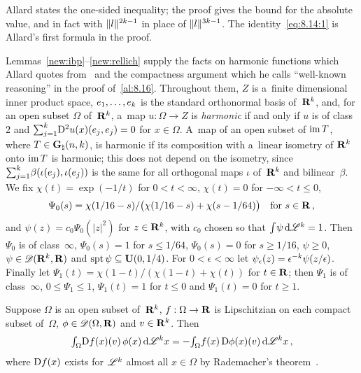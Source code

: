 \begin{remark}
    \label{rem:8.14}
    Allard states the one-sided inequality; the proof gives the bound for the absolute value, and in
    fact with $\|l\|^{2k - 1}$ in place of $\|l\|^{3 k - 1}$. The identity~\eqref{eq:8.14:1}
    is Allard's first formula in the proof.
\end{remark}

\begin{miniremark}
    \label{mr:harmonic}
    Lemmas~\ref{new:ibp}--\ref{new:rellich} supply the facts on harmonic functions which Allard
    quotes from~\cite[5.2.5, 5.2.6]{Federer1969} and the compactness argument which he calls
    ``well-known reasoning'' in the proof of~\ref{al:8.16}. Throughout them, $Z$ is a~finite
    dimensional inner product space, $e_1, \ldots, e_{k}$ is the standard orthonormal basis
    of~$\mathbf{R}^{k}$, and, for an open subset $\Omega$ of~$\mathbf{R}^{k}$, a~map $u : \Omega \to Z$ is
    \emph{harmonic} if and only if $u$ is of class~$2$ and ${\textstyle\sum_{j=1}^{k}} \mathrm{D}^2 u(x)(e_j,e_j)
    = 0$ for $x \in \Omega$. A~map of an open subset of $\operatorname{im} T$, where $T \in \mathbf{G}_{\natural}(n,k)$,
    is harmonic if its composition with a~linear isometry of $\mathbf{R}^{k}$ onto $\operatorname{im} T$ is harmonic;
    this does not depend on the isometry, since ${\textstyle\sum_{j=1}^{k}} \beta(\iota(e_j),\iota(e_j))$
    is the same for all orthogonal maps $\iota$ of~$\mathbf{R}^{k}$ and bilinear~$\beta$. We fix
    $\chi(t) = \exp(-1/t)$ for $0 < t < \infty$, $\chi(t) = 0$ for $-\infty < t \le 0$,
    \begin{displaymath}
        \Psi_0(s) = \chi(1/16 - s) / \big( \chi(1/16 - s) + \chi(s - 1/64) \big) \quad \text{for $s
        \in \mathbf{R}$} \,,
    \end{displaymath}
    and $\psi(z) = c_0 \Psi_0(|z|^2)$ for $z \in \mathbf{R}^{k}$, with $c_0$ chosen so that ${\textstyle\int_{}^{}}
    \psi \,\mathrm{d} \mathscr{L}^{k} = 1$. Then $\Psi_0$ is of class~$\infty$, $\Psi_0(s) = 1$ for $s \le 1/64$,
    $\Psi_0(s) = 0$ for $s \ge 1/16$, $\psi \ge 0$, $\psi \in \mathscr{D}(\mathbf{R}^{k},\mathbf{R})$ and $\operatorname{spt} \psi
    \subseteq \mathbf{U}(0,1/4)$. For $0 < \epsilon < \infty$ let $\psi_\epsilon(z) = \epsilon^{-k}
    \psi(z/\epsilon)$. Finally let $\Psi_1(t) = \chi(1 - t) / (\chi(1 - t) + \chi(t))$ for $t \in
    \mathbf{R}$; then $\Psi_1$ is of class~$\infty$, $0 \le \Psi_1 \le 1$, $\Psi_1(t) = 1$ for $t \le 0$ and
    $\Psi_1(t) = 0$ for $t \ge 1$.
\end{miniremark}

\begin{lemma}[new]
    \label{new:ibp}
    Suppose $\Omega$ is an open subset of~$\mathbf{R}^{k}$, $f : \Omega \to \mathbf{R}$ is Lipschitzian on each
    compact subset of~$\Omega$, $\phi \in \mathscr{D}(\Omega,\mathbf{R})$ and $v \in \mathbf{R}^{k}$. Then
    \begin{displaymath}
        {\textstyle\int_{\Omega}^{}} \mathrm{D} f(x)(v) \, \phi(x) \,\mathrm{d} \mathscr{L}^{k} x = - {\textstyle\int_{\Omega}^{}} f(x) \,
        \mathrm{D} \phi(x)(v) \,\mathrm{d} \mathscr{L}^{k} x \,,
    \end{displaymath}
    where $\mathrm{D} f(x)$ exists for $\mathscr{L}^{k}$ almost all $x \in \Omega$ by Rademacher's
    theorem~\cite[3.1.6]{Federer1969}.
\end{lemma}


